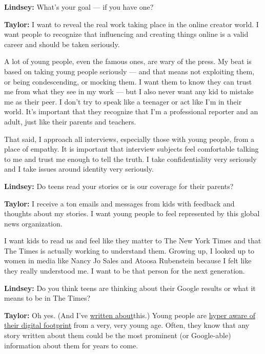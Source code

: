 \textbf{Lindsey:} What's your goal --- if you have one?

\textbf{Taylor:} I want to reveal the real work taking place in the
online creator world. I want people to recognize that influencing and
creating things online is a valid career and should be taken seriously.

A lot of young people, even the famous ones, are wary of the press. My
beat is based on taking young people seriously --- and that means not
exploiting them, or being condescending, or mocking them. I want them to
know they can trust me from what they see in my work --- but I also
never want any kid to mistake me as their peer. I don't try to speak
like a teenager or act like I'm in their world. It's important that they
recognize that I'm a professional reporter and an adult, just like their
parents and teachers.

That said, I approach all interviews, especially those with young
people, from a place of empathy. It is important that interview subjects
feel comfortable talking to me and trust me enough to tell the truth. I
take confidentiality very seriously and I take issues around identity
very seriously.

\textbf{Lindsey:} Do teens read your stories or is our coverage for
their parents?

\textbf{Taylor:} I receive a ton emails and messages from kids with
feedback and thoughts about my stories. I want young people to feel
represented by this global news organization.

I want kids to read us and feel like they matter to The New York Times
and that The Times is actually working to understand them. Growing up, I
looked up to women in media like Nancy Jo Sales and Atoosa Rubenstein
because I felt like they really understood me. I want to be that person
for the next generation.

\textbf{Lindsey:} Do you think teens are thinking about their Google
results or what it means to be in The Times?

\textbf{Taylor:} Oh yes. (And I've
\href{https://www.theatlantic.com/technology/archive/2019/02/when-kids-realize-their-whole-life-already-online/582916/}{written
about}this.) Young people are
\href{https://www.theatlantic.com/technology/archive/2019/02/when-kids-realize-their-whole-life-already-online/582916/}{hyper
aware of their digital footprint} from a very, very young age. Often,
they know that any story written about them could be the most prominent
(or Google-able) information about them for years to come.

